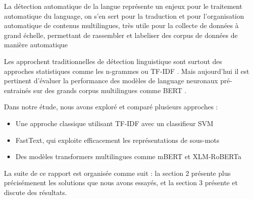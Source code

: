 
La détection automatique de la langue représente un enjeux pour le traitement automatique du language, on s'en sert pour la traduction et pour l'organisation automatique de contenus multilingues, très utile pour la collecte de données à grand échelle, permettant de rassembler et labeliser des corpus de données de manière automatique

Les approchent traditionnelles de détection linguistique sont surtout des approches statistiques comme les n-grammes \cite{cavnar1994n} ou TF-IDF \cite{baldwin2010language}. Mais aujourd'hui il est pertinent d'évaluer la performance des modèles de language neuronaux pré-entrainés sur des grands corpus multilingues comme BERT \cite{devlin2019bert}.

Dans notre étude, nous avons exploré et comparé plusieurs approches :
\begin{itemize}
    \item Une approche classique utilisant TF-IDF avec un classifieur SVM
    \item FastText, qui exploite efficacement les représentations de sous-mots \cite{joulin2017bag}
    \item Des modèles transformers multilingues comme mBERT \cite{devlin2019bert} et XLM-RoBERTa \cite{conneau2020unsupervised}
\end{itemize}

La suite de ce rapport est organisée comme suit : la section 2 présente plus précisémenent les solutions que nous avons essayés, et la section 3 présente et discute des résultats.


